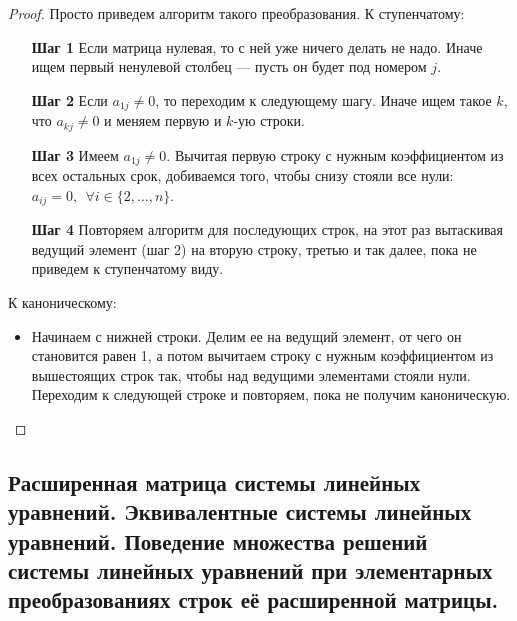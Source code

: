 \documentclass[a4paper, 12pt]{article}
\begin{document}
\begin{proof}
Просто приведем алгоритм такого преобразования. К ступенчатому:
\begin{itemize}
\item[\textbf{Шаг 1}] Если матрица нулевая, то с ней уже ничего делать не надо. Иначе ищем первый ненулевой столбец — пусть он будет под номером $j$.
\item[\textbf{Шаг 2}] Если $a_{1j} \neq 0$, то переходим к следующему шагу. Иначе ищем такое $k$, что $a_{kj} \neq 0$ и меняем первую и $k$-ую строки.
\item[\textbf{Шаг 3}] Имеем $a_{1j} \neq 0$. Вычитая первую строку с нужным коэффициентом из всех остальных срок, добиваемся того, чтобы снизу стояли все нули: $a_{ij} = 0,\ \ \forall i \in \{2, \ldots, n\}$.
\item[\textbf{Шаг 4}] Повторяем алгоритм для последующих строк, на этот раз вытаскивая ведущий элемент (шаг 2) на вторую строку, третью и так далее, пока не приведем к ступенчатому виду.
\end{itemize}

К каноническому:
\begin{itemize}
\item Начинаем с нижней строки. Делим ее на ведущий элемент, от чего он становится равен 1, а потом вычитаем строку с нужным коэффициентом из вышестоящих строк так, чтобы над ведущими элементами стояли нули. Переходим к следующей строке и повторяем, пока не получим каноническую.
\end{itemize}
\end{proof}


\subsection{Расширенная матрица системы линейных уравнений. Эквивалентные системы линейных уравнений. Поведение множества решений системы линейных уравнений при элементарных преобразованиях строк её расширенной матрицы.}
\end{document}
